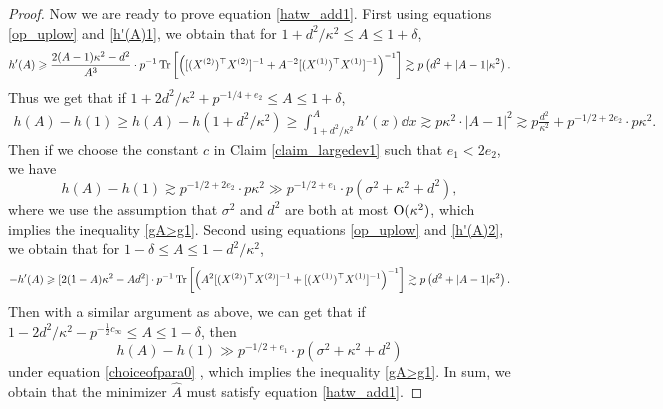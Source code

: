 \begin{proof}



Now we are ready to prove equation \eqref{hatw_add1}. First using equations \eqref{op_uplow} and  \eqref{h'(A)1}, we obtain that for $1+d^2/\kappa^2 \le A\le 1+\delta$,
$$h'(A)\geqslant \frac{2(A-1)\kappa^2 - d^2}{A^3} \cdot p^{-1} \operatorname{Tr}\left[\left([(X^{(2)})^\top X^{(2)}]^{-1} + A^{-2} [(X^{(1)})^\top X^{(1)}]^{-1}\right)^{-1}\right] \gtrsim p\left(d^2 + |A-1|\kappa^2\right).$$
Thus we get that if $1+2d^2/\kappa^2 +p^{-1/4+e_2}\le A\le 1+\delta$,
\begin{align*}
h(A)-h(1)\ge h(A)-h(1+d^2/\kappa^2) \ge \int_{1+d^2/\kappa^2}^A h'(x)\dd x \gtrsim p\kappa^2 \cdot |A-1|^2  \gtrsim p\frac{d^2}{\kappa^2} + p^{-1/2+2e_2}\cdot p\kappa^2.
\end{align*}
Then if we choose the constant $c$ in Claim \ref{claim_largedev1} such that $e_1<2e_2$, we have 
$$ h(A)-h(1)\gtrsim  p^{-1/2+2e_2}\cdot p\kappa^2 \gg p^{-1/2+e_1}\cdot p\left(\sigma^2 +\kappa^2+d^2 \right),$$
where we use the assumption that $\sigma^2$ and $d^2$ are both at most $\operatorname{O}(\kappa^2)$, which implies the inequality \eqref{gA>g1}. Second using equations \eqref{op_uplow} and  \eqref{h'(A)2}, we obtain that for $1-\delta \le A \le 1-d^2/\kappa^2$,
$$- h'(A)\geqslant  [2(1-A)\kappa^2 - Ad^2] \cdot p^{-1} \operatorname{Tr}\left[\left(A^2[(X^{(2)})^\top X^{(2)}]^{-1} + [(X^{(1)})^\top X^{(1)}]^{-1}\right)^{-1}\right]  \gtrsim p\left(d^2 + |A-1|\kappa^2\right).$$
Then with a similar argument as above, we can get that if $1-2d^2/\kappa^2 - p^{-\frac12c_\infty}\le A\le 1-\delta$, then 
$$ h(A)-h(1) \gg p^{-1/2+e_1}\cdot p\left(\sigma^2 +\kappa^2+d^2 \right)$$
under equation \eqref{choiceofpara0} , which implies the inequality \eqref{gA>g1}. In sum, we obtain that the minimizer $\hat A$ must satisfy equation \eqref{hatw_add1}.

\end{proof}
